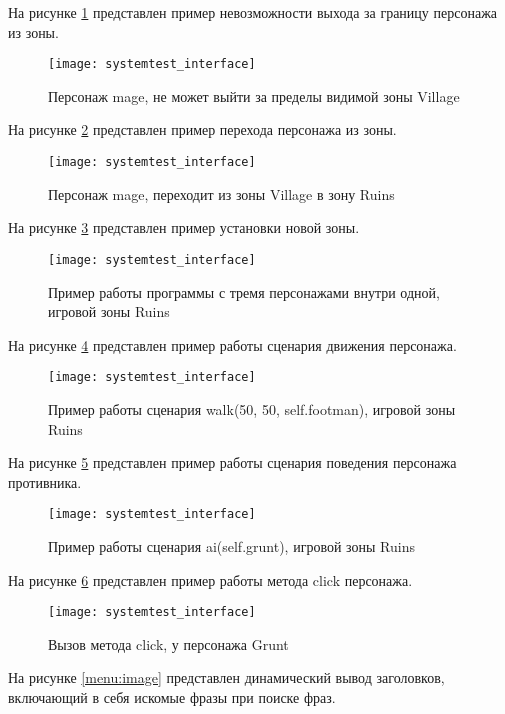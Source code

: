 На рисунке \ref{systemtest_interface3:image} представлен пример невозможности выхода за границу персонажа из зоны.
\begin{figure}[H]
	\centering
	\texttt{[image: systemtest\_interface]}
	\caption{Персонаж mage, не может выйти за пределы видимой зоны Village}
	\label{systemtest_interface3:image}
\end{figure}

На рисунке \ref{systemtest_interface4:image} представлен пример перехода персонажа из зоны.
\begin{figure}[H]
	\centering
	\texttt{[image: systemtest\_interface]}
	\caption{Персонаж mage, переходит из зоны Village в зону Ruins}
	\label{systemtest_interface4:image}
\end{figure}

На рисунке \ref{systemtest_interface5:image} представлен пример установки новой зоны.
\begin{figure}[H]
	\centering
	\texttt{[image: systemtest\_interface]}
	\caption{Пример работы программы с тремя персонажами внутри одной, игровой зоны Ruins}
	\label{systemtest_interface5:image}
\end{figure}

На рисунке \ref{systemtest_interface6:image} представлен пример работы сценария движения персонажа.
\begin{figure}[H]
	\centering
	\texttt{[image: systemtest\_interface]}
	\caption{Пример работы сценария walk(50, 50, self.footman), игровой зоны Ruins}
	\label{systemtest_interface6:image}
\end{figure}

На рисунке \ref{systemtest_interface7:image} представлен пример работы сценария поведения персонажа противника.
\begin{figure}[H]
	\centering
	\texttt{[image: systemtest\_interface]}
	\caption{Пример работы сценария ai(self.grunt), игровой зоны Ruins}
	\label{systemtest_interface7:image}
\end{figure}

На рисунке \ref{systemtest_interface8:image} представлен пример работы метода click персонажа.
\begin{figure}[H]
	\centering
	\texttt{[image: systemtest\_interface]}
	\caption{Вызов метода click, у персонажа Grunt}
	\label{systemtest_interface8:image}
\end{figure}
На рисунке \ref{menu:image} представлен динамический вывод заголовков, включающий в себя искомые фразы при поиске фраз.
